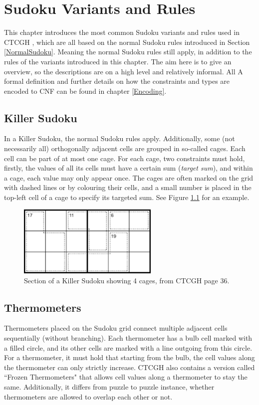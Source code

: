 \chapter{Sudoku Variants and Rules}\label{SudokuVariantsAndRules}
This chapter introduces the most common Sudoku variants and rules used in CTCGH \cite{CrackingTheCryptic2021}, which are all based on the normal Sudoku rules introduced in Section \ref{NormalSudoku}. Meaning the normal Sudoku rules still apply, in addition to the rules of the variants introduced in this chapter. The aim here is to give an overview, so the descriptions are on a high level and relatively informal. All A formal definition and further details on how the constraints and types are encoded to CNF can be found in chapter \ref{Encoding}.

\section{Killer Sudoku}
In a Killer Sudoku, the normal Sudoku rules apply. Additionally, some (not necessarily all) orthogonally adjacent cells are grouped in so-called cages. Each cell can be part of at most one cage. For each cage, two constraints must hold, firstly, the values of all its cells must have a certain sum (\emph{target sum}), and within a cage, each value may only appear once. The cages are often marked on the grid with dashed lines or by colouring their cells, and a small number is placed in the top-left cell of a cage to specify its targeted sum. See Figure \ref{fig:exampleKiller} for an example.

\begin{figure}
\centering
\includegraphics[width=0.6\textwidth]{Figures/Killer Example (CTC page 36).png}
\caption{Section of a Killer Sudoku showing 4 cages, from CTCGH \cite{CrackingTheCryptic2021} page 36.}
\label{fig:exampleKiller}
\end{figure}

\section{Thermometers}
Thermometers placed on the Sudoku grid connect multiple adjacent cells sequentially (without branching). Each thermometer has a bulb cell marked with a filled circle, and its other cells are marked with a line outgoing from this circle. For a thermometer, it must hold that starting from the bulb, the cell values along the thermometer can only strictly increase. CTCGH \cite{CrackingTheCryptic2021} also contains a version called ``Frozen Thermometers" that allows cell values along a thermometer to stay the same. Additionally, it differs from puzzle to puzzle instance, whether thermometers are allowed to overlap each other or not.

